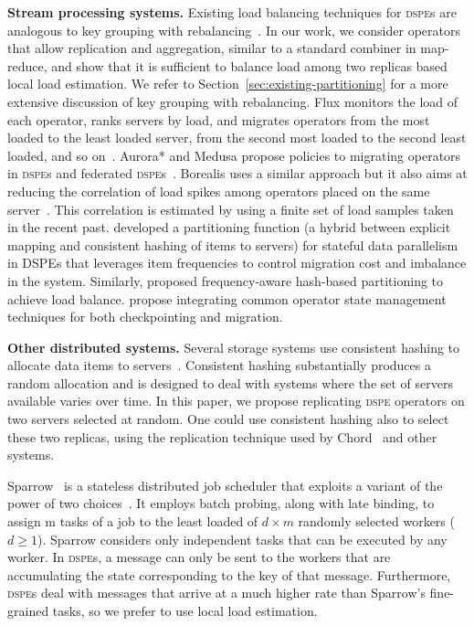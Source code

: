 \documentclass[10pt,conference,letterpaper]{IEEEtran}
\newcommand{\spara}[1]{\smallskip\noindent\textbf{#1}}
\newcommand{\dspe}{\textsc{dspe}\xspace}
\newcommand{\dspes}{{\dspe}s\xspace}
\begin{document}
\spara{Stream processing systems.}
Existing load balancing techniques for \dspes are analogous to key grouping with rebalancing~\citep{shah2003flux,cherniack2003scalable,xing2005dynamic,gedik2013partitioning,balkesen2013adaptive,castro2013integrating}.
In our work, we consider operators that allow replication and aggregation, similar to a standard combiner in map-reduce, and show that it is sufficient to balance load among two replicas based local load estimation.
We refer to Section~\ref{sec:existing-partitioning} for a more extensive discussion of key grouping with rebalancing.
Flux monitors the load of each operator, ranks servers by load, and migrates operators from the most loaded to the least loaded server, from the second most loaded to the second least loaded, and so on~\citep{shah2003flux}.
Aurora* and Medusa propose policies to migrating operators in \dspes and federated \dspes~\citep{cherniack2003scalable}.
Borealis uses a similar approach but it also aims at reducing the correlation of load spikes among operators placed on the same server~\citep{xing2005dynamic}.
This correlation is estimated by using a finite set of load samples taken in the recent past.
\citet{gedik2013partitioning} developed a partitioning function (a hybrid between explicit mapping and consistent hashing of items to servers) for stateful data parallelism in DSPEs that leverages item frequencies to control migration cost and imbalance in the system.
Similarly, \citet{ balkesen2013adaptive} proposed frequency-aware hash-based partitioning to achieve load balance.
\citet{castro2013integrating} propose integrating common operator state management techniques for both checkpointing and migration.

\enlargethispage{\baselineskip}

\spara{Other distributed systems.}
Several storage systems use consistent hashing to allocate data items to servers~\citep{karger1997consistent}.
Consistent hashing substantially produces a random allocation and is designed to deal with systems where the set of servers available varies over time.
In this paper, we propose replicating \dspe operators on two servers selected at random.
One could use consistent hashing also to select these two replicas, using the replication technique used by Chord~\citep{stoica2001chord} and other systems.

Sparrow~\cite{ousterhout2013sparrow} is a stateless distributed job scheduler that exploits a variant of the power of two choices~\citep{park2011multiplechoices}. 
It employs batch probing, along with late binding, to assign m tasks of a job to the least loaded of $d \times m$ randomly selected workers ($d \geq 1$). 
Sparrow considers only independent tasks that can be executed by any worker.
In \dspes, a message can only be sent to the workers that are accumulating the state corresponding to the key of that message.
Furthermore, \dspes deal with messages that arrive at a much higher rate than Sparrow's fine-grained tasks, so we prefer to use local load estimation.
\end{document}
